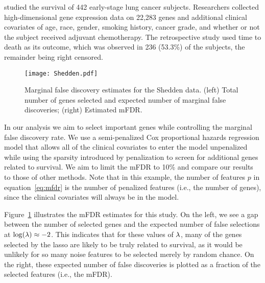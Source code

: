 \citet{Shedden2008} studied the survival of 442 early-stage lung cancer subjects. Researchers collected high-dimensional gene expression data on 22,283 genes and additional clinical covariates of age, race, gender, smoking history, cancer grade, and whether or not the subject received adjuvant chemotherapy.  The retrospective study used time to death as its outcome, which was observed in 236 (53.3\%) of the subjects, the remainder being right censored.

\begin{figure} [!htb]
 \centering
  \texttt{[image: Shedden.pdf]}
  \caption{\label{Fig:Shedden} Marginal false discovery estimates for the Shedden data.  (left) Total number of genes selected and expected number of marginal false discoveries; (right) Estimated mFDR.}
\end{figure}

In our analysis we aim to select important genes while controlling the marginal false discovery rate.  We use a semi-penalized Cox proportional hazards regression model that allows all of the clinical covariates to enter the model unpenalized while using the sparsity introduced by penalization to screen for additional genes related to survival.  We aim to limit the mFDR to 10\% and compare our results to those of other methods.  Note that in this example, the number of features $p$ in equation~\eqref{eq:mfdr} is the number of penalized features (i.e., the number of genes), since the clinical covariates will always be in the model.

Figure~\ref{Fig:Shedden} illustrates the mFDR estimates for this study.  On the left, we see a gap between the number of selected genes and the expected number of false selections at $\log(\lambda) \approx -2$.  This indicates that for these values of $\lambda$, many of the genes selected by the lasso are likely to be truly related to survival, as it would be unlikely for so many noise features to be selected merely by random chance.  On the right, these expected number of false discoveries is plotted as a fraction of the selected features (i.e., the mFDR).

